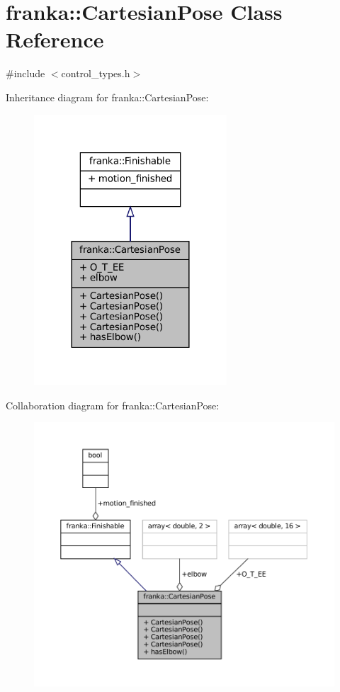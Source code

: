 \hypertarget{classfranka_1_1CartesianPose}{}\section{franka\+:\+:Cartesian\+Pose Class Reference}
\label{classfranka_1_1CartesianPose}


{\ttfamily \#include $<$control\+\_\+types.\+h$>$}



Inheritance diagram for franka\+:\+:Cartesian\+Pose\+:
\nopagebreak
\begin{figure}[H]
\begin{center}
\leavevmode
\includegraphics[width=204pt]{classfranka_1_1CartesianPose__inherit__graph}
\end{center}
\end{figure}


Collaboration diagram for franka\+:\+:Cartesian\+Pose\+:
\nopagebreak
\begin{figure}[H]
\begin{center}
\leavevmode
\includegraphics[width=350pt]{classfranka_1_1CartesianPose__coll__graph}
\end{center}
\end{figure}
